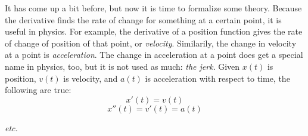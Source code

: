 \documentclass[../revisedmain.tex]{subfiles}
\begin{document}
	It has come up a bit before, but now it is time to formalize some theory. Because the derivative finds the rate of change for something at a certain point, it is useful in physics. For example, the derivative of a position function gives the rate of change of position of that point, or \textit{velocity}. Similarily, the change in velocity at a point is \textit{acceleration}. The change in acceleration at a point does get a special name in physics, too, but it is not used as much: \textit{the jerk}. Given $x(t)$ is position, $v(t)$ is velocity, and $a(t)$ is acceleration with respect to time, the following are true: $$x'(t)=v(t)$$$$x''(t)=v'(t)=a(t)$$\begin{center}
		\textit{etc.}
	\end{center}
\end{document}
